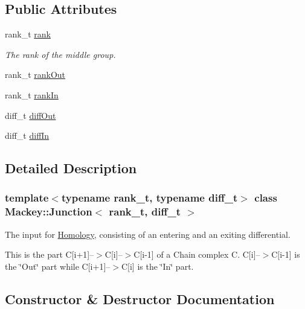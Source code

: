 \subsection*{Public Attributes}
\begin{DoxyCompactItemize}
\item 
rank\+\_\+t \hyperlink{classMackey_1_1Junction_a70d63a0f6ad20b052210ab0009815a9e}{rank}
\begin{DoxyCompactList}\small\item\em The rank of the middle group. \end{DoxyCompactList}\item 
rank\+\_\+t \hyperlink{classMackey_1_1Junction_afe400bc60b84966b933fd57c11400607}{rank\+Out}
\item 
rank\+\_\+t \hyperlink{classMackey_1_1Junction_a6174a3bef929f4b5b892d3b7ccb20528}{rank\+In}
\item 
diff\+\_\+t \hyperlink{classMackey_1_1Junction_a909fce095bc4647a312d6b10480b2d9a}{diff\+Out}
\item 
diff\+\_\+t \hyperlink{classMackey_1_1Junction_a581e0d7b62b7bf380d68936a79828cfc}{diff\+In}
\end{DoxyCompactItemize}


\subsection{Detailed Description}
\subsubsection*{template$<$typename rank\+\_\+t, typename diff\+\_\+t$>$\newline
class Mackey\+::\+Junction$<$ rank\+\_\+t, diff\+\_\+t $>$}

The input for \hyperlink{classMackey_1_1Homology}{Homology}, consisting of an entering and an exiting differential. 

This is the part C\mbox{[}i+1\mbox{]}--$>$C\mbox{[}i\mbox{]}--$>$C\mbox{[}i-\/1\mbox{]} of a Chain complex C. C\mbox{[}i\mbox{]}--$>$C\mbox{[}i-\/1\mbox{]} is the \char`\"{}\+Out\char`\"{} part while C\mbox{[}i+1\mbox{]}--$>$C\mbox{[}i\mbox{]} is the \char`\"{}\+In\char`\"{} part. 

\subsection{Constructor \& Destructor Documentation}
\mbox{\label{classMackey_1_1Junction_a943b60d8e77594e4b19da7a5e40cb62e}} 
